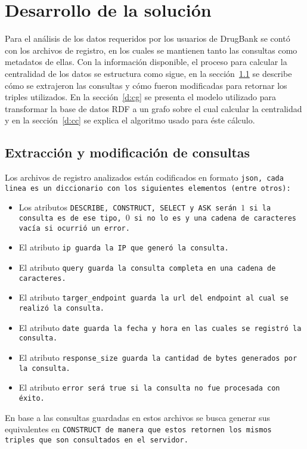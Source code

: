
\chapter{Desarrollo de la solución}\label{c:desarrollo}

Para el análisis de los datos requeridos por los usuarios de DrugBank se contó
con los archivos de registro, en los cuales se mantienen tanto las consultas
como metadatos de ellas.
Con la información disponible, el proceso para calcular la
centralidad de los datos se estructura como sigue, en la sección~\ref{d:emc}
se describe cómo se extrajeron las consultas y cómo fueron modificadas para
retornar los triples utilizados. En la sección~\ref{d:cg} se presenta el modelo
utilizado para transformar la base de datos RDF a un grafo sobre el cual
calcular la centralidad y en la sección~\ref{d:cc} se explica el algoritmo
usado para éste cálculo.

\section{Extracción y modificación de consultas}\label{d:emc}
Los archivos de registro analizados están codificados en formato \tt{json},
cada linea es un diccionario con los siguientes elementos (entre otros):
\begin{itemize}
  \item
    Los atributos \tt{DESCRIBE}, \tt{CONSTRUCT}, \tt{SELECT} y \tt{ASK} serán
    $1$ si la consulta es de ese tipo, $0$ si no lo es y una cadena de
    caracteres vacía si ocurrió un error.
  \item
    El atributo \tt{ip} guarda la IP que generó la consulta.
  \item
    El atributo \tt{query} guarda la consulta completa en una cadena de
    caracteres. 
  \item
    El atributo \tt{targer\_endpoint} guarda la \tt{url} del \tt{endpoint} al
    cual se realizó la consulta.
  \item
    El atributo \tt{date} guarda la fecha y hora en las cuales se registró la
    consulta.
  \item
    El atributo \tt{response\_size} guarda la cantidad de bytes generados por la
    consulta.
  \item
    El atributo \tt{error} será \tt{true} si la consulta no fue procesada con
    éxito.
\end{itemize}

En base a las consultas guardadas en estos archivos se busca generar sus
equivalentes en \tt{CONSTRUCT} de manera que estos retornen los mismos triples
que son consultados en el servidor.

